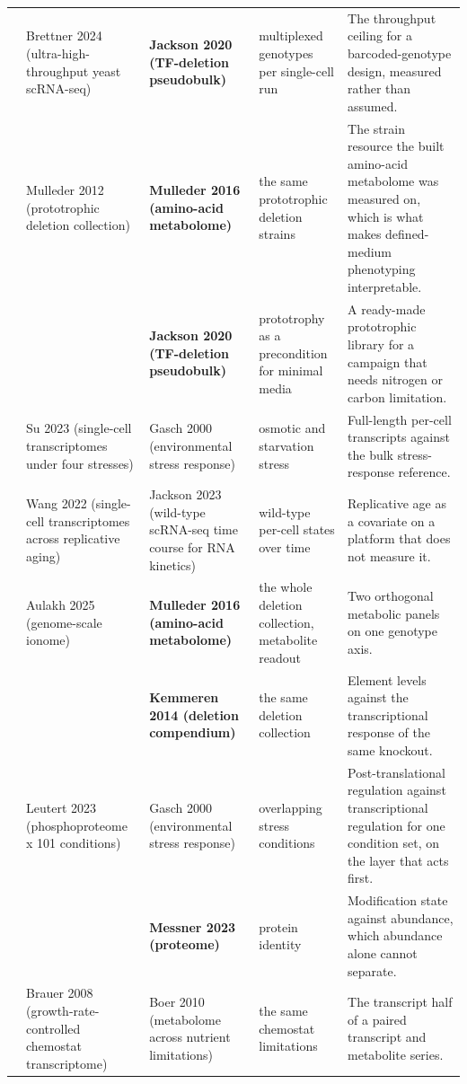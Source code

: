 \begin{landscape}
\begin{longtable}{@{}r@{\hspace{4pt}} L{42mm} L{44mm} L{48mm} L{96mm}@{}}
 & Brettner 2024 (ultra-high-throughput yeast scRNA-seq) & \textbf{Jackson 2020 (TF-deletion pseudobulk)} & multiplexed genotypes per single-cell run & The throughput ceiling for a barcoded-genotype design, measured rather than assumed. \\
 & Mulleder 2012 (prototrophic deletion collection) & \textbf{Mulleder 2016 (amino-acid metabolome)} & the same prototrophic deletion strains & The strain resource the built amino-acid metabolome was measured on, which is what makes defined-medium phenotyping interpretable. \\
 &  & \textbf{Jackson 2020 (TF-deletion pseudobulk)} & prototrophy as a precondition for minimal media & A ready-made prototrophic library for a campaign that needs nitrogen or carbon limitation. \\
 & Su 2023 (single-cell transcriptomes under four stresses) & Gasch 2000 (environmental stress response) & osmotic and starvation stress & Full-length per-cell transcripts against the bulk stress-response reference. \\
 & Wang 2022 (single-cell transcriptomes across replicative aging) & Jackson 2023 (wild-type scRNA-seq time course for RNA kinetics) & wild-type per-cell states over time & Replicative age as a covariate on a platform that does not measure it. \\
 & Aulakh 2025 (genome-scale ionome) & \textbf{Mulleder 2016 (amino-acid metabolome)} & the whole deletion collection, metabolite readout & Two orthogonal metabolic panels on one genotype axis. \\
 &  & \textbf{Kemmeren 2014 (deletion compendium)} & the same deletion collection & Element levels against the transcriptional response of the same knockout. \\
 & Leutert 2023 (phosphoproteome x 101 conditions) & Gasch 2000 (environmental stress response) & overlapping stress conditions & Post-translational regulation against transcriptional regulation for one condition set, on the layer that acts first. \\
 &  & \textbf{Messner 2023 (proteome)} & protein identity & Modification state against abundance, which abundance alone cannot separate. \\
 & Brauer 2008 (growth-rate-controlled chemostat transcriptome) & Boer 2010 (metabolome across nutrient limitations) & the same chemostat limitations & The transcript half of a paired transcript and metabolite series. \\

\end{longtable}
\end{landscape}
